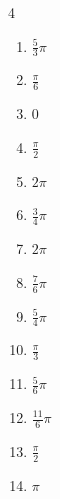 


\setcounter{quesnum}{100}

\begin{multicols}{4}
\begin{enumerate}
  \itemsep=3pt
  \item $\displaystyle \frac{5}{3}\pi$

  \item $\displaystyle \frac{\pi}{6}$

  \item $\displaystyle 0$

  \item $\displaystyle \frac{\pi}{2}$

  \item $\displaystyle 2\pi$

  \item $\displaystyle \frac{3}{4}\pi$

  \item $\displaystyle 2\pi$

  \item $\displaystyle \frac{7}{6}\pi$

  \item $\displaystyle \frac{5}{4}\pi$

  \item $\displaystyle \frac{\pi}{3}$

  \item $\displaystyle \frac{5}{6}\pi$

  \item $\displaystyle \frac{11}{6}\pi$

  \item $\displaystyle \frac{\pi}{2}$

  \item $\displaystyle \pi$


\end{enumerate}
\end{multicols}
